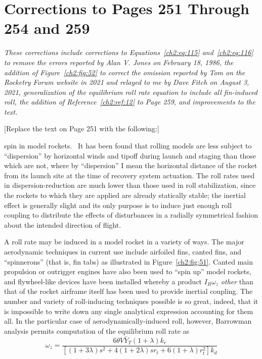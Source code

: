 \chapter{Corrections to Pages 251 Through 254 and 259}\label{supp:ch2-2022}

{\itshape\noindent These corrections include corrections to Equations~\eqref{ch2:eq:115}
and~\eqref{ch2:eq:116} to remove the errors reported by Alan V. Jones on February 18, 1986, the
addition of Figure~\ref{ch2:fig:52} to correct the omission reported by Tom on the Rocketry Forum
website in 2021 and relayed to me by Dave Fitch on August 3, 2021, generalization of the
equilibrium roll rate equation to include all fin-induced roll, the addition of
Reference~\ref{ch2:ref:12} to Page 259, and improvements to the text.\par}

\bigskip
\begin{center}
[Replace the text on Page 251 with the following:]
\end{center}

\noindent spin in model rockets.\  It has been found that rolling models are less subject to
``dispersion'' by horizontal winds and tipoff during launch and staging than those which are not,
where by ``dispersion'' I mean the horizontal distance of the rocket from its launch site at the
time of recovery system actuation. The roll rates used in dispersion-reduction are much lower than
those used in roll stabilization, since the rockets to which they are applied are already
statically stable; the inertial effect is generally slight and its only purpose is to induce just
enough roll coupling to distribute the effects of disturbances in a radially symmetrical fashion
about the intended direction of flight.

A roll rate may be induced in a model rocket in a variety of ways. The major aerodynamic
techniques in current use include airfoiled fins, canted fins, and ``spinnerons'' (that is, fin
tabs) as illustrated in Figure~\ref{ch2:fig:51}. Canted main propulsion or outrigger engines have
also been used to ``spin up'' model rockets, and flywheel-like devices have been installed whereby
a product $I_R\omega_z$ \emph{other} than that of the rocket airframe itself has been used to
provide inertial coupling. The number and variety of roll-inducing techniques possible is so
great, indeed, that it is impossible to write down any single analytical expression accounting
for them all. In the particular case of aerodynamically-induced roll, however, Barrowman analysis
permits computation of the equilibrium roll rate as
\begin{equation*}\tag{115}
\omega_z = \frac{6\theta V\bar{Y}_T(1 + \lambda)k_r}
  {[(1 + 3\lambda)s^{2} + 4(1 + 2\lambda)s r_t + 6(1 + \lambda)r_t^{2}]k_d}
\end{equation*}

